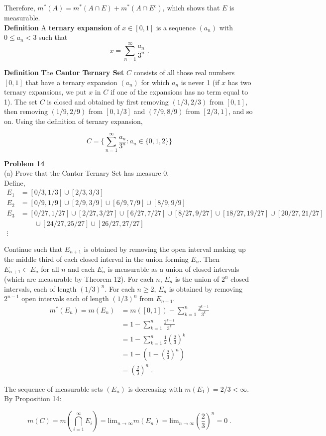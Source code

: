\documentclass[a4paper]{article}
\begin{document}
Therefore, $m^*(A) = m^*(A \cap E) + m^*(A \cap E^c)$, which shows that $E$ is measurable. \\

{\bf Definition} A {\bf ternary expansion} of $x \in [0,1]$ is a sequence $(a_n)$ with $0\leq a_n < 3$ such that 
$$x = \sum_{n=1}^\infty \frac{a_n}{3^n} \;.$$

{\bf Definition} The {\bf Cantor Ternary Set} $C$ consists of all those real numbers $[0,1]$ that have a ternary expansion $(a_n)$ for which $a_n$ is never 1 (if $x$ has two ternary expansions, we put $x$ in $C$ if one of the expansions has no term equal to 1). The set $C$ is closed and obtained by first removing $(1/3, 2/3)$ from $[0,1]$, then removing $(1/9,2/9)$ from $[0,1/3]$ and $(7/9,8/9)$ from $[2/3,1]$, and so on. Using the definition of ternary expansion,

$$C =  \Bigg\{ \sum_{n=1}^\infty \frac{a_n}{3^n} : a_n \in \{0, 1, 2\} \Bigg\}$$

{\bf Problem 14}\\

(a) Prove that the Cantor Ternary Set has measure 0. \\

Define,
\begin{align*}
E_1 &= [0/3,1/3] \cup [2/3, 3/3]\\
E_2 &= [0/9,1/9]\cup[2/9,3/9]\cup [6/9,7/9]\cup[8/9,9/9]\\
E_3 &= [0/27,1/27]\cup [2/27,3/27] \cup [6/27, 7/27]\cup[8/27,9/27] \cup [18/27, 19/27]\cup [20/27,21/27]\\
&\quad \quad \cup [24/27,25/27]\cup [26/27, 27/27]\\
\vdots
\end{align*}

Continue such that $E_{n+1}$ is obtained by removing the open interval making up the middle third of each closed interval in the union forming $E_n$. Then $E_{n+1} \subset E_n$ for all $n$ and each $E_n$ is measurable as a union of closed intervals (which are measurable by Theorem 12). For each $n$, $E_n$ is the union of $2^n$ closed intervals, each of length $(1/3)^n$. For each $n \geq 2$, $E_n$ is obtained by removing $2^{n-1}$ open intervals each of length $(1/3)^n$ from $E_{n-1}$.
\begin{align*}
m^*(E_n) = m(E_n) &= m([0,1]) -\sum_{k=1}^n \frac{2^{k-1}}{3^k}\\
&= 1 -\sum_{k=1}^n \frac{2^{k-1}}{3^k}\\
&= 1- \sum_{k=1}^n \frac{1}{2}\left(\frac{2}{3}\right)^k \\
&= 1 - \left(1-\left(\frac{2}{3}\right)^n\right)\\
&= \left(\frac{2}{3}\right)^n \;.
\end{align*}

The sequence of measurable sets $(E_n)$ is decreasing with $m(E_1) = 2/3 < \infty$. By Proposition 14:

$$m(C) = m\left(\bigcap_{i=1}^\infty E_i\right) = \text{lim}_{n\rightarrow \infty} m(E_n) = \text{lim}_{n\rightarrow \infty} \left(\frac{2}{3}\right)^n = 0 \;.$$
\end{document}
